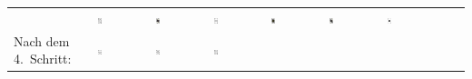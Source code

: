 \begin{tabular}{m{30mm}m{11mm}m{11mm}m{11mm}m{11mm}m{11mm}m{11mm}m{11mm}m{11mm}}
&
\includegraphics[width=0.08\textwidth]{./inf/SEKII/19_Java_Sortierverfahren/Pik10.png}
&
\includegraphics[width=0.08\textwidth]{./inf/SEKII/19_Java_Sortierverfahren/PikBube.png}
&
\includegraphics[width=0.08\textwidth]{./inf/SEKII/19_Java_Sortierverfahren/Pik9.png}
&
\includegraphics[width=0.08\textwidth]{./inf/SEKII/19_Java_Sortierverfahren/PikDame.png}
&
\includegraphics[width=0.08\textwidth]{./inf/SEKII/19_Java_Sortierverfahren/PikKoenig.png}
&
\includegraphics[width=0.08\textwidth]{./inf/SEKII/19_Java_Sortierverfahren/PikAs.png}
\\
Nach dem 4.\ Schritt: &
\includegraphics[width=0.08\textwidth]{./inf/SEKII/19_Java_Sortierverfahren/Pik7.png}
&
\includegraphics[width=0.08\textwidth]{./inf/SEKII/19_Java_Sortierverfahren/Pik8.png}
&
\includegraphics[width=0.08\textwidth]{./inf/SEKII/19_Java_Sortierverfahren/Pik10.png}

\end{tabular}
